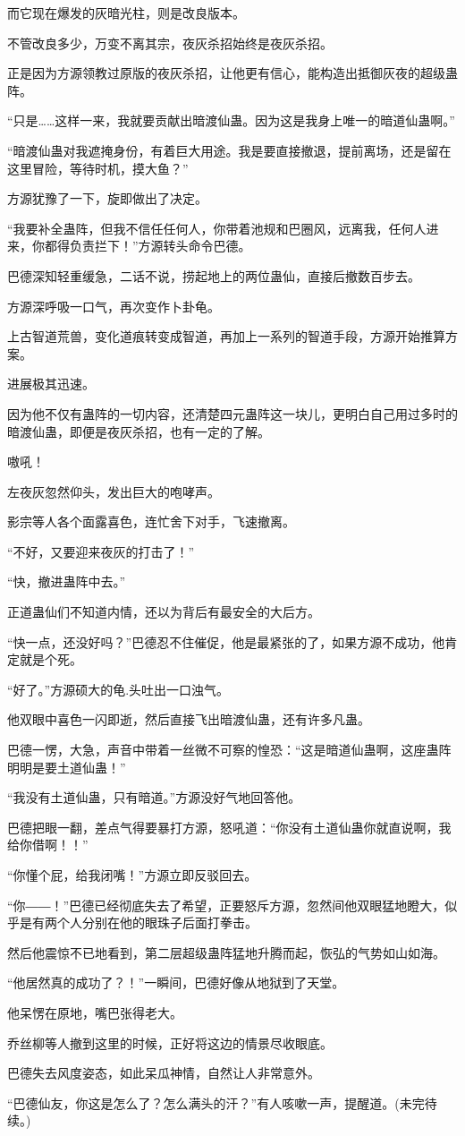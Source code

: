 \begin{this_body}
而它现在爆发的灰暗光柱，则是改良版本。

不管改良多少，万变不离其宗，夜灰杀招始终是夜灰杀招。

正是因为方源领教过原版的夜灰杀招，让他更有信心，能构造出抵御灰夜的超级蛊阵。

“只是……这样一来，我就要贡献出暗渡仙蛊。因为这是我身上唯一的暗道仙蛊啊。”

“暗渡仙蛊对我遮掩身份，有着巨大用途。我是要直接撤退，提前离场，还是留在这里冒险，等待时机，摸大鱼？”

方源犹豫了一下，旋即做出了决定。

“我要补全蛊阵，但我不信任任何人，你带着池规和巴圈风，远离我，任何人进来，你都得负责拦下！”方源转头命令巴德。

巴德深知轻重缓急，二话不说，捞起地上的两位蛊仙，直接后撤数百步去。

方源深呼吸一口气，再次变作卜卦龟。

上古智道荒兽，变化道痕转变成智道，再加上一系列的智道手段，方源开始推算方案。

进展极其迅速。

因为他不仅有蛊阵的一切内容，还清楚四元蛊阵这一块儿，更明白自己用过多时的暗渡仙蛊，即便是夜灰杀招，也有一定的了解。

嗷吼！

左夜灰忽然仰头，发出巨大的咆哮声。

影宗等人各个面露喜色，连忙舍下对手，飞速撤离。

“不好，又要迎来夜灰的打击了！”

“快，撤进蛊阵中去。”

正道蛊仙们不知道内情，还以为背后有最安全的大后方。

“快一点，还没好吗？”巴德忍不住催促，他是最紧张的了，如果方源不成功，他肯定就是个死。

“好了。”方源硕大的龟.头吐出一口浊气。

他双眼中喜色一闪即逝，然后直接飞出暗渡仙蛊，还有许多凡蛊。

巴德一愣，大急，声音中带着一丝微不可察的惶恐：“这是暗道仙蛊啊，这座蛊阵明明是要土道仙蛊！”

“我没有土道仙蛊，只有暗道。”方源没好气地回答他。

巴德把眼一翻，差点气得要暴打方源，怒吼道：“你没有土道仙蛊你就直说啊，我给你借啊！！”

“你懂个屁，给我闭嘴！”方源立即反驳回去。

“你――！”巴德已经彻底失去了希望，正要怒斥方源，忽然间他双眼猛地瞪大，似乎是有两个人分别在他的眼珠子后面打拳击。

然后他震惊不已地看到，第二层超级蛊阵猛地升腾而起，恢弘的气势如山如海。

“他居然真的成功了？！”一瞬间，巴德好像从地狱到了天堂。

他呆愣在原地，嘴巴张得老大。

乔丝柳等人撤到这里的时候，正好将这边的情景尽收眼底。

巴德失去风度姿态，如此呆瓜神情，自然让人非常意外。

“巴德仙友，你这是怎么了？怎么满头的汗？”有人咳嗽一声，提醒道。(未完待续。)

\end{this_body}


